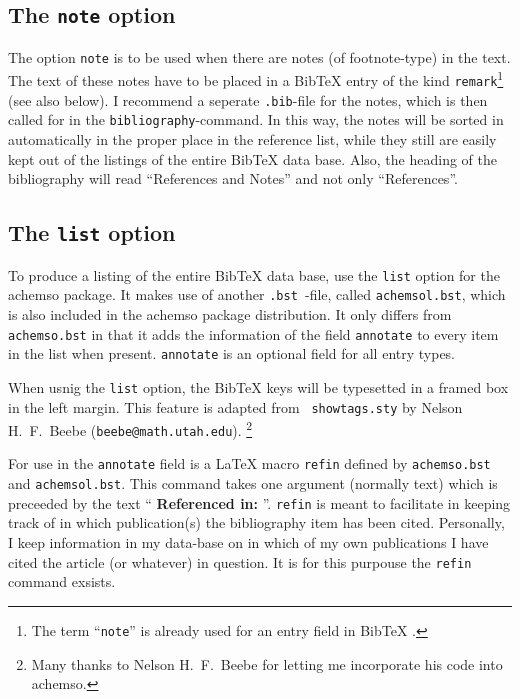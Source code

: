 \documentclass{article}
\begin{document}
\subsection{The \texttt{note} option}

\label{noteoption}

The option \texttt{note} is to be used when there are notes (of
footnote-type) in the text. The text of these notes have to be placed in a
BibTeX entry of the kind \texttt{remark}\footnote{%
The term ``\texttt{note}'' is already used for an entry field in BibTeX .}
(see also below). I recommend a seperate \texttt{.bib}-file for the notes,
which is then called for in the \texttt{bibliography}-command. In this way,
the notes will be sorted in automatically in the proper place in the
reference list, while they still are easily kept out of the listings of the
entire BibTeX data base. Also, the heading of the bibliography will read
``References and Notes'' and not only ``References''.

\subsection{The \texttt{list} option}

To produce a listing of the entire BibTeX data base, use the \texttt{list}
option for the \textsf{achemso} package. It makes use of another \texttt{.bst%
}-file, called \texttt{achemsol.bst}, which is also included in the \textsf{%
achemso} package distribution. It only differs from \texttt{achemso.bst} in
that it adds the information of the field \texttt{annotate} to every item in
the list when present. \texttt{annotate} is an optional field for all entry
types.

When usnig the \texttt{list} option, the BibTeX keys will be typesetted in a
framed box in the left margin. This feature is adapted from \texttt{%
showtags.sty} by Nelson H.\ F.\ Beebe (\texttt{beebe@math.utah.edu}).%
\footnote{%
Many thanks to Nelson H.\ F.\ Beebe for letting me incorporate his code into 
\textsf{achemso}.}

For use in the \texttt{annotate} field is a LaTeX macro \texttt{refin}
defined by \texttt{achemso.bst} and \texttt{achemsol.bst}. This command
takes one argument (normally text) which is preceeded by the text ``\textbf{%
Referenced in: }''. \texttt{refin} is meant to facilitate in keeping track
of in which publication(s) the bibliography item has been cited. Personally,
I keep information in my data-base on in which of my own publications I have
cited the article (or whatever) in question. It is for this purpouse the 
\texttt{refin} command exsists.
\end{document}
